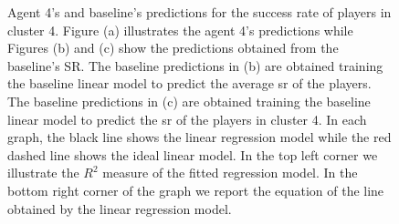 \begin{figure}[h!]
  \centering
    
    \caption{Agent 4's and baseline's predictions for the success rate of players in cluster 4. Figure (a) illustrates the agent 4's predictions while Figures (b) and (c) show the predictions obtained from the baseline's SR. The baseline predictions in (b) are obtained training the baseline linear model to predict the average \acs{sr} of the players. The baseline predictions in (c) are obtained training the baseline linear model to predict the \acs{sr} of the players in cluster 4. In each graph, the black line shows the linear regression model while the red dashed line shows the ideal linear model. In the top left corner we illustrate the $R^2$ measure of the fitted regression model. In the bottom right corner of the graph we report the equation of the line obtained by the linear regression model.}
    \label{fig:example_predictions}
\end{figure}
